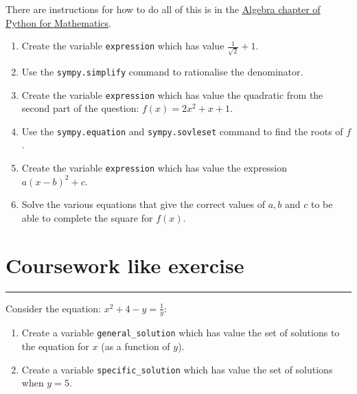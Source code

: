 \documentclass{article}
\begin{document}
There are instructions for how to do all of this is in the
\href{https://vknight.org/pfm/tools-for-mathematics/algebra/how/}{Algebra chapter of Python for Mathematics}.


\begin{enumerate}
\item
  Create the variable \texttt{expression} which has value
        $\frac{1}{\sqrt{2}} + 1$.
\item Use the \texttt{sympy.simplify} command to rationalise the
        denominator.
\item Create the variable \texttt{expression} which has value the
        quadratic from the second part of the question: $f(x) = 2x^ 2 + x + 1$.
\item Use the \texttt{sympy.equation} and
        \texttt{sympy.sovleset} command to find the roots of $f$.
\item Create the variable \texttt{expression} which has value the
        expression $a(x-b) ^ 2 + c$.
\item Solve the various equations that give the correct values of $a, b$ and
    $c$ to be able to complete the square for $f(x)$.
\end{enumerate}


\section{Coursework like exercise}
\hrule


Consider the equation: $x ^ 2 + 4 - y = \frac{1}{y}$:

\begin{enumerate}
    \item Create a variable \texttt{general_solution} which has value the set of solutions to
   the equation for $x$ (as a function of $y$).
\item Create a variable \texttt{specific_solution} which has value the set of solutions when $y = 5$. 
\end{enumerate}
\end{document}
